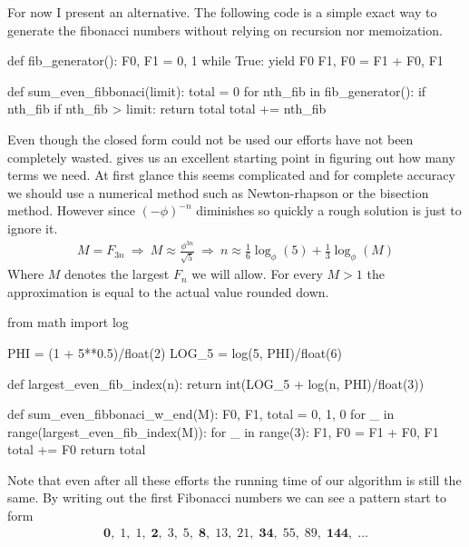 For now I present an alternative. The following code is a simple exact way to generate the fibonacci numbers without relying on recursion nor memoization. 
%
\begin{multicols}{2}
\begin{pythoncode}
	def fib_generator():
	    F0, F1 = 0, 1
	    while True:
	        yield F0
	        F1, F0 = F1 + F0, F1
\end{pythoncode}
\vfill
\columnbreak
\begin{pythoncode}
def sum_even_fibbonaci(limit):
    total = 0
    for nth_fib in fib_generator():
        if nth_fib %
        if nth_fib > limit: return total
        total += nth_fib
\end{pythoncode}
\end{multicols}
Even though the closed form could not be used our efforts have not been completely wasted.  gives
us an excellent starting point in figuring out how many terms we need. At first glance this seems complicated and for complete accuracy 
we should use a numerical method such as Newton-rhapson or the bisection method. However since $(-\phi)^{-n}$ diminishes so quickly a
 rough solution is just to ignore it. 
\begin{align*}
	M = F_{3n} 
	\ \Rightarrow \ 
	M \approx \frac{\phi^{3n}}{\sqrt{5}}
	\ \Rightarrow \
	n \approx \frac{1}{6} \log_\phi(5) + \frac{1}{3} \log_\phi(M)
\end{align*}
Where $M$ denotes the largest $F_n$ we will allow. For every $M > 1$ the approximation is equal to the actual value rounded down. 
%
\begin{pythoncode}
	from math import log

	PHI = (1 + 5**0.5)/float(2)
	LOG_5 = log(5, PHI)/float(6)
	
	def largest_even_fib_index(n):
	    return int(LOG_5 + log(n, PHI)/float(3))
	
	def sum_even_fibbonaci_w_end(M):
	    F0, F1, total = 0, 1, 0
	    for _ in range(largest_even_fib_index(M)):
	        for _ in range(3):
	            F1, F0 = F1 + F0, F1
	        total += F0
	    return total
\end{pythoncode}
%
Note that even after all these efforts the running time of our algorithm is still the same. 
By writing out the first Fibonacci numbers we can see a pattern start to form
%
\begin{align*}
	\mathbf{0},   \; 1,     \; 1,  \; 
	\mathbf{2},   \; 3,     \; 5,  \; 
	\mathbf{8},   \; 13,    \; 21, \; 
	\mathbf{34} , \; 55,    \; 89, \; 
	\mathbf{144}, \; \ldots
\end{align*}
